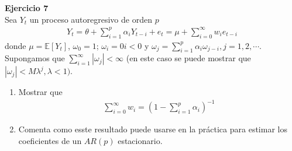 \documentclass[a4paper, 11pt]{article}
\newenvironment{problem}[2][Ejercicio]
{ \begin{mdframed}[backgroundcolor= red!50] \textbf{#1 #2} \\}
	{  \end{mdframed}}
\begin{document}
\begin{problem}{7} 
    Sea $Y_t$ un proceso autoregresivo de orden $p$
    \begin{align*}
        Y_t = \theta + \sum_{i = 1}^{p } \alpha_i Y_{t-i } + e_t = \mu + \sum_{i=0}^{\infty} w_i e_{t-i }
    \end{align*}
    donde $\mu = \mathbb{E}[Y_t ]$, $\omega_0 = 1$; $ \omega_i = 0  i < 0$ y $\omega_j = \sum_{i=1}^{p } \alpha_i \omega_{j-i }, j = 1,2,\cdots. $ Supongamos que $\sum_{i=1}^{\infty} |\omega_j| < \infty $ (en este caso se puede mostrar que $|\omega _j| < M \lambda^j, \lambda <1) $. 

    \begin{enumerate}
        \item Mostrar que
        \begin{align*}
            \sum_{i= 0}^{\infty} w_i = \left(1-\sum_{i=1}^{p} \alpha_i \right)^{-1}
        \end{align*}
        \item Comenta como esste resultado puede usarse en la práctica para estimar los coeficientes de un $AR(p)$ estacionario.
    \end{enumerate}


\end{problem}
\end{document}
